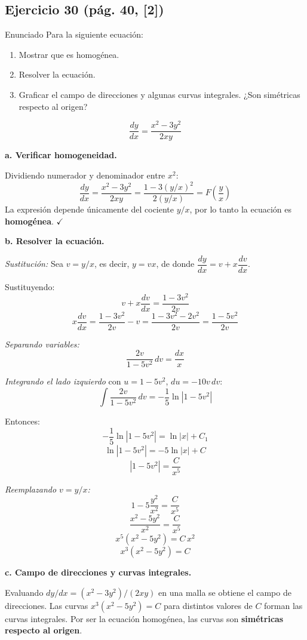 \subsection*{Ejercicio 30 \quad\normalfont\small(pág. 40, [2])}
\begin{enunciado}{Enunciado}
    Para la siguiente ecuación:
    \begin{enumerate}[label=\textbf{\alph*.}]
        \item Mostrar que es homogénea.
        \item Resolver la ecuación.
        \item Graficar el campo de direcciones y algunas curvas integrales.
            ¿Son simétricas respecto al origen?
    \end{enumerate}
    \[
        \frac{dy}{dx} = \frac{x^2 - 3y^2}{2xy}
    \]
\end{enunciado}

\begin{respuesta}

\textbf{a. Verificar homogeneidad.}

Dividiendo numerador y denominador entre $x^2$:
\[
    \frac{dy}{dx} = \frac{x^2 - 3y^2}{2xy}
    = \frac{1 - 3(y/x)^2}{2(y/x)}
    = F\!\left(\frac{y}{x}\right)
\]
La expresión depende únicamente del cociente $y/x$, por lo tanto
la ecuación es \textbf{homogénea}. $\checkmark$

\medskip
\textbf{b. Resolver la ecuación.}

\textit{Sustitución:} Sea $v = y/x$, es decir, $y = vx$, de donde
$\dfrac{dy}{dx} = v + x\dfrac{dv}{dx}$.

Sustituyendo:
\[
    v + x\frac{dv}{dx} = \frac{1 - 3v^2}{2v}
\]
\[
    x\frac{dv}{dx} = \frac{1-3v^2}{2v} - v
    = \frac{1 - 3v^2 - 2v^2}{2v}
    = \frac{1 - 5v^2}{2v}
\]

\textit{Separando variables:}
\[
    \frac{2v}{1 - 5v^2}\,dv = \frac{dx}{x}
\]

\textit{Integrando el lado izquierdo} con $u = 1 - 5v^2$, $du = -10v\,dv$:
\[
    \int\frac{2v}{1-5v^2}\,dv = -\frac{1}{5}\ln\!\left|1 - 5v^2\right|
\]

Entonces:
\[
    -\frac{1}{5}\ln|1 - 5v^2| = \ln|x| + C_1
\]
\[
    \ln|1 - 5v^2| = -5\ln|x| + C
\]
\[
    |1 - 5v^2| = \frac{C}{x^5}
\]

\textit{Reemplazando $v = y/x$:}
\[
    1 - 5\frac{y^2}{x^2} = \frac{C}{x^5}
\]
\[
    \frac{x^2 - 5y^2}{x^2} = \frac{C}{x^5}
\]
\[
    x^5(x^2 - 5y^2) = C\,x^2
\]
\[
    \boxed{x^3(x^2 - 5y^2) = C}
\]

\medskip
\textbf{c. Campo de direcciones y curvas integrales.}

Evaluando $dy/dx = (x^2-3y^2)/(2xy)$ en una malla se obtiene el campo de
direcciones. Las curvas $x^3(x^2-5y^2) = C$ para distintos valores de $C$
forman las curvas integrales. Por ser la ecuación homogénea, las curvas son
\textbf{simétricas respecto al origen}.

\end{respuesta}

\newpage




\newpage
